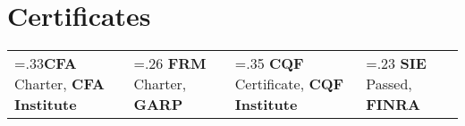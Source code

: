 \documentclass[letterpaper,hidelinks]{article}
\newcommand{\resumeSubHeadingListStart}{\begin{itemize}[leftmargin=0.1in, label={}]}
\newcommand{\resumeSubHeadingListEnd}{\end{itemize}}
\begin{document}
\vspace{-4pt}
\section{Certificates}
\resumeSubHeadingListStart
\small{\item{
  \begin{tabularx}{0.96\textwidth} { 
     >{\centering\arraybackslash\hsize=.33\hsize}X 
    || >{\centering\arraybackslash\hsize=.26\hsize}X 
    || >{\centering\arraybackslash\hsize=.35\hsize}X  
    || >{\centering\arraybackslash\hsize=.23\hsize}X } 
    \textbf{CFA} Charter, \textbf{CFA Institute} & 
    \textbf{FRM} Charter, \textbf{GARP} & 
    \textbf{CQF} Certificate, \textbf{CQF Institute} & 
    \textbf{SIE} Passed, \textbf{FINRA}
  \end{tabularx}
}}
\resumeSubHeadingListEnd

\vspace{-11pt}
\end{document}
